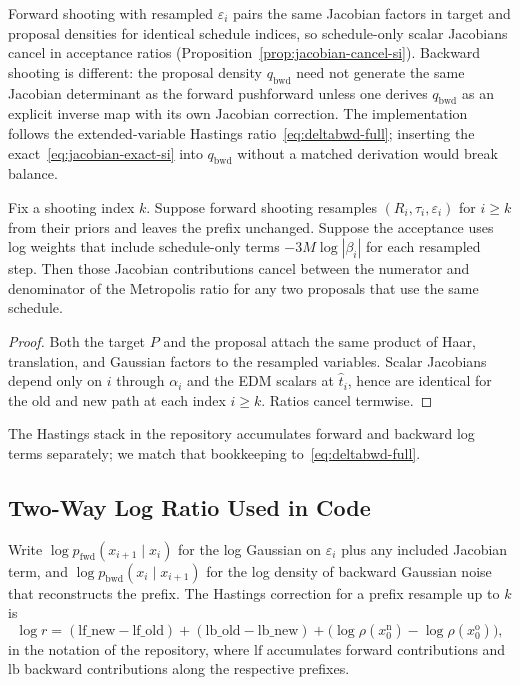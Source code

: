 \begin{remark}
Forward shooting with resampled $\varepsilon_i$ pairs the same Jacobian factors in target and proposal densities for identical schedule indices, so schedule-only scalar Jacobians cancel in acceptance ratios (Proposition~\ref{prop:jacobian-cancel-si}). Backward shooting is different: the proposal density $q_{\mathrm{bwd}}$ need not generate the same Jacobian determinant as the forward pushforward unless one derives $q_{\mathrm{bwd}}$ as an explicit inverse map with its own Jacobian correction. The implementation follows the extended-variable Hastings ratio~\eqref{eq:deltabwd-full}; inserting the exact~\eqref{eq:jacobian-exact-si} into $q_{\mathrm{bwd}}$ without a matched derivation would break balance.
\end{remark}

\begin{proposition}
\label{prop:jacobian-cancel-si}
Fix a shooting index $k$. Suppose forward shooting resamples $(R_i,\tau_i,\varepsilon_i)$ for $i \geq k$ from their priors and leaves the prefix unchanged. Suppose the acceptance uses log weights that include schedule-only terms $-3M \log|\beta_i|$ for each resampled step. Then those Jacobian contributions cancel between the numerator and denominator of the Metropolis ratio for any two proposals that use the same schedule.
\end{proposition}

\begin{proof}
Both the target $P$ and the proposal attach the same product of Haar, translation, and Gaussian factors to the resampled variables. Scalar Jacobians depend only on $i$ through $\alpha_i$ and the EDM scalars at $\hat{t}_i$, hence are identical for the old and new path at each index $i \geq k$. Ratios cancel termwise.
\end{proof}

The Hastings stack in the repository accumulates forward and backward log terms
separately; we match that bookkeeping to~\eqref{eq:deltabwd-full}.

\subsection{Two-Way Log Ratio Used in Code}

Write $\log p_{\mathrm{fwd}}(x_{i+1}\mid x_i)$ for the log Gaussian on $\varepsilon_i$ plus any included Jacobian term, and $\log p_{\mathrm{bwd}}(x_i\mid x_{i+1})$ for the log density of backward Gaussian noise that reconstructs the prefix. The Hastings correction for a prefix resample up to $k$ is
\begin{equation}
  \label{eq:logr-impl-si}
  \log r
  = (\mathrm{lf\_new} - \mathrm{lf\_old})
  + (\mathrm{lb\_old} - \mathrm{lb\_new})
  + \bigl(\log\rho(x_0^{\mathrm{n}}) - \log\rho(x_0^{\mathrm{o}})\bigr),
\end{equation}
in the notation of the repository, where $\mathrm{lf}$ accumulates forward contributions and $\mathrm{lb}$ backward contributions along the respective prefixes.

